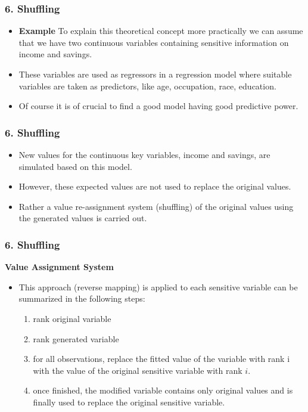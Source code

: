 \documentclass{beamer}
\begin{document}
\begin{frame}
	\frametitle{6. Shuffling}
	\begin{itemize}
\item \textbf{Example} To explain this theoretical concept more practically we can assume that we have
two continuous variables containing sensitive information on income and savings.
\item These variables are used as regressors in a regression model where suitable variables
are taken as predictors, like age, occupation, race, education. 
\item Of course it is of
crucial to find a good model having good predictive power. 
\end{itemize}
\end{frame}
\begin{frame}
	\frametitle{6. Shuffling}
	\begin{itemize}
\item New values for the
continuous key variables, income and savings, are simulated based on this model.

\item However, these expected
values are not used to replace the original values. 
\item Rather a value re-assignment system (shuffling) of the original
values using the generated values is carried out. 


\end{itemize}
\end{frame}
\begin{frame}
	\frametitle{6. Shuffling}
\textbf{Value Assignment System}
	\begin{itemize}
		\item This approach (reverse mapping)
is applied to each sensitive variable can be summarized in the following steps:
\begin{enumerate}
\item rank original variable
\item rank generated variable
\item for all observations, replace the fitted value of the variable with rank i
with the value of the original sensitive variable with rank $i$.
\item once finished, the modiﬁed variable contains only original values and is finally
used to replace the original sensitive variable.
\end{enumerate}
\end{itemize}
\end{frame}
\end{document}
